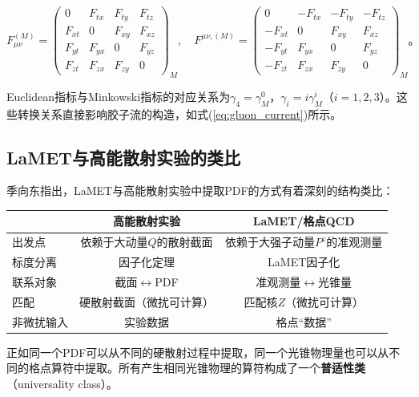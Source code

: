 \documentclass[12pt,a4paper]{ctexart}
\theoremstyle{definition}
\begin{document}
\begin{equation}
F^{(M)}_{\mu\nu} =
\begin{pmatrix}
0   & F_{tx} & F_{ty} & F_{tz} \\
F_{xt} & 0      & F_{xy} & F_{xz} \\
F_{yt} & F_{yx} & 0       & F_{yz} \\
F_{zt} & F_{zx} & F_{zy}  & 0
\end{pmatrix}_{\!\!M}, \quad
F^{\mu\nu,(M)} =
\begin{pmatrix}
0      & -F_{tx} & -F_{ty} & -F_{tz} \\
-F_{xt} & 0       & F_{xy}  & F_{xz} \\
-F_{yt} & F_{yx}  & 0       & F_{yz} \\
-F_{zt} & F_{zx}  & F_{zy}  & 0
\end{pmatrix}_{\!\!M}。
\label{eq:F_Minkowski_full}
\end{equation}

Euclidean指标与Minkowski指标的对应关系为$\gamma_4 = \gamma^0_M$，$\gamma_i = i\gamma^i_M$（$i = 1,2,3$）。这些转换关系直接影响胶子流的构造，如式(\ref{eq:gluon_current})所示。

\subsection{LaMET与高能散射实验的类比}

季向东指出\cite{Ji2014LaMET}，LaMET与高能散射实验中提取PDF的方式有着深刻的结构类比：

\begin{center}
\begin{tabular}{lcc}
\toprule
& 高能散射实验 & LaMET/格点QCD \\
\midrule
出发点        & 依赖于大动量$Q$的散射截面 & 依赖于大强子动量$P^z$的准观测量 \\
标度分离      & 因子化定理                  & LaMET因子化 \\
联系对象      & 截面$\leftrightarrow$PDF    & 准观测量$\leftrightarrow$光锥量 \\
匹配          & 硬散射截面（微扰可计算）    & 匹配核$Z$（微扰可计算） \\
非微扰输入    & 实验数据                    & 格点``数据'' \\
\bottomrule
\end{tabular}
\end{center}

正如同一个PDF可以从不同的硬散射过程中提取，同一个光锥物理量也可以从不同的格点算符中提取。所有产生相同光锥物理的算符构成了一个\textbf{普适性类}（universality class）\cite{Ji2014LaMET}。
\end{document}
